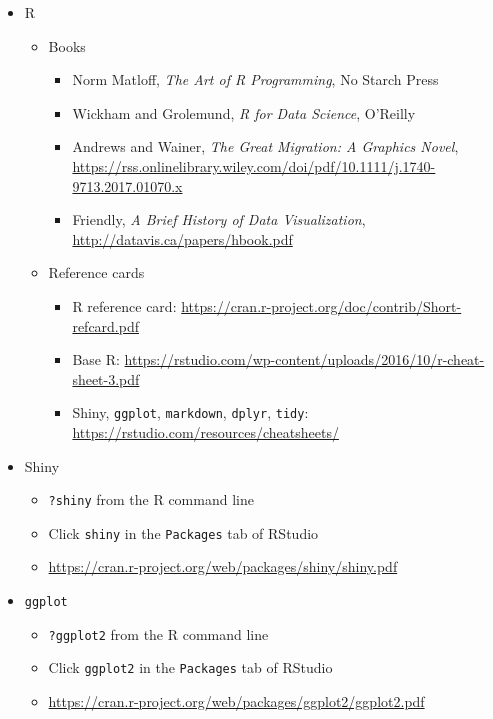 \documentclass[10pt, letterpaper]{article}
\begin{document}
\begin{spacing}{1.0}
\begin{itemize}
  \item R
    \begin{itemize}   
      \item Books
        \begin{itemize}[noitemsep]
          \item Norm Matloff, \textit{The Art of R Programming}, No Starch Press
          \item Wickham and Grolemund, \textit{R for Data Science}, O'Reilly
          \item Andrews and Wainer, \textit{The Great Migration:  A Graphics Novel}, \url{https://rss.onlinelibrary.wiley.com/doi/pdf/10.1111/j.1740-9713.2017.01070.x}
          \item Friendly, \textit{A Brief History of Data Visualization}, \url{http://datavis.ca/papers/hbook.pdf}
        \end{itemize}
      \item Reference cards
        \begin{itemize}[noitemsep]
          \item R reference card:  \url{https://cran.r-project.org/doc/contrib/Short-refcard.pdf}
          \item Base R:  \url{https://rstudio.com/wp-content/uploads/2016/10/r-cheat-sheet-3.pdf}
          \item Shiny, \texttt{ggplot}, \texttt{markdown}, \texttt{dplyr}, \texttt{tidy}: \url{https://rstudio.com/resources/cheatsheets/}
        \end{itemize}
    \end{itemize}

  \item Shiny
    \begin{itemize}[noitemsep]
        \item \texttt{?shiny} from the R command line
        \item Click \texttt{shiny} in the \texttt{Packages} tab of RStudio
        \item \url{https://cran.r-project.org/web/packages/shiny/shiny.pdf}
    \end{itemize}

  \item \texttt{ggplot}
    \begin{itemize}[noitemsep]
        \item \texttt{?ggplot2} from the R command line
        \item Click \texttt{ggplot2} in the \texttt{Packages} tab of RStudio
        \item \url{https://cran.r-project.org/web/packages/ggplot2/ggplot2.pdf}
    \end{itemize}


\end{itemize}
\end{spacing}
\end{document}
